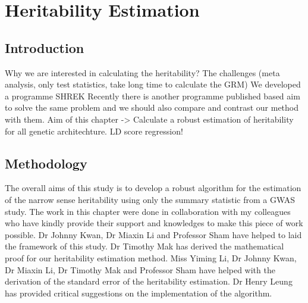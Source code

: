 \chapter{Heritability Estimation}

	\section{Introduction}
	Why we are interested in calculating the heritability?
	The challenges (meta analysis, only test statistics, take long time to calculate the GRM)
	We developed a programme SHREK
	Recently there is another programme published based aim to solve the same problem and we should also compare and contrast our method with them.  %
	Aim of this chapter -> Calculate a robust estimation of heritability for all genetic architechture. 
	LD score regression!
	\section{Methodology}	
		The overall aims of this study is to develop a robust algorithm for the estimation of the narrow sense heritability using only the summary statistic from a \gls{GWAS} study. The work in this chapter were done in collaboration with my colleagues who have kindly provide their support and knowledges to make this piece of work possible.
		Dr Johnny Kwan, Dr Miaxin Li and Professor Sham have helped to laid the framework of this study. Dr Timothy Mak has derived the mathematical proof for our heritability estimation method. Miss Yiming Li, Dr Johnny Kwan, Dr Miaxin Li, Dr Timothy Mak and Professor Sham have helped with the derivation of the standard error of the heritability estimation. Dr Henry Leung has provided critical suggestions on the implementation of the algorithm.
